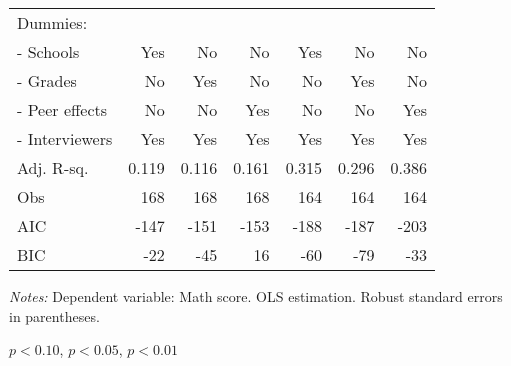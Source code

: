 \begin{table}[!h]
\begin{adjustbox}{width=1\textwidth}
\begin{threeparttable}
\begin{tabular}{l*{6}{D{.}{.}{-1}}}
Dummies: &&&&& \\                    
- Schools             &                 Yes   &                  No   &                  No   &                 Yes   &                  No   &                  No   \\
- Grades              &                  No   &                 Yes   &                  No   &                  No   &                 Yes   &                  No   \\
- Peer effects        &                  No   &                  No   &                 Yes   &                  No   &                  No   &                 Yes   \\
- Interviewers        &                 Yes   &                 Yes   &                 Yes   &                 Yes   &                 Yes   &                 Yes   \\
\midrule
Adj. R-sq.          &               0.119   &               0.116   &               0.161   &               0.315   &               0.296   &               0.386   \\
Obs                 &                 168   &                 168   &                 168   &                 164   &                 164   &                 164   \\
AIC                 &                -147   &                -151   &                -153   &                -188   &                -187   &                -203   \\
BIC                 &                 -22   &                 -45   &                  16   &                 -60   &                 -79   &                 -33   \\
\bottomrule
\end{tabular}
\begin{tablenotes}
\footnotesize
\item \textit{Notes:} Dependent variable: Math score. OLS estimation. Robust standard errors in parentheses. \\
\item \sym{*} \(p<0.10\), \sym{**} \(p<0.05\), \sym{***} \(p<0.01\)
\end{tablenotes}
\end{threeparttable}
\end{adjustbox}
\label{tab:rev_cause}
\end{table}